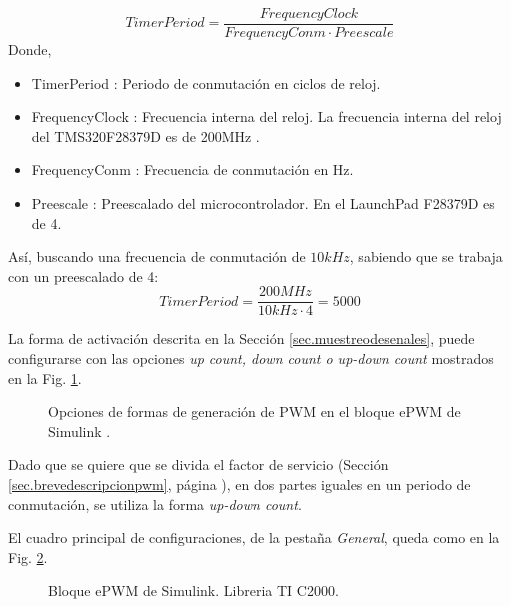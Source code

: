 \documentclass{report}
\begin{document}
\begin{equation}
    TimerPeriod = \frac{FrequencyClock}{FrequencyConm \cdot Preescale}\label{eq.ciclospwm}
\end{equation}
Donde,
\begin{itemize}
    \item TimerPeriod : Periodo de conmutación en ciclos de reloj.
    \item FrequencyClock : Frecuencia interna del reloj. La frecuencia interna del reloj del TMS320F28379D es de 200MHz \cite{diecisiete}.
    \item FrequencyConm : Frecuencia de conmutación en Hz.
    \item Preescale : Preescalado del microcontrolador. En el LaunchPad F28379D es de 4.
\end{itemize}

Así, buscando una frecuencia de conmutación de $10kHz$, sabiendo que se trabaja con un preescalado de 4:
\begin{equation*}
    TimerPeriod = \frac{200MHz}{10kHz \cdot 4} = 5000
\end{equation*}

La forma de activación descrita en la Sección \ref{sec.muestreodesenales}, puede configurarse con las opciones \textit{up count, down count o up-down count} mostrados en la Fig. \ref{fig.countpwm}. 

\begin{figure}[!h]
    \begin{center}
    \caption{Opciones de formas de generación de PWM en el bloque ePWM de Simulink \cite{cincuentaycinco}.}
    \label{fig.countpwm} 
    \end{center}
\end{figure}

Dado que se quiere que se divida el factor de servicio (Sección \ref{sec.brevedescripcionpwm}, página \pageref{eq.factordeservicio}), en dos partes iguales en un periodo de conmutación, se utiliza la forma \textit{up-down count}. 

El cuadro principal de configuraciones, de la pestaña \textit{General}, queda como en la Fig. \ref{fig.configuracionpwm1}.


\begin{figure}[!h]
    \begin{center}
    \caption{Bloque ePWM de Simulink. Libreria TI C2000.}
    \label{fig.configuracionpwm1} 
    \end{center}
\end{figure}
\end{document}

